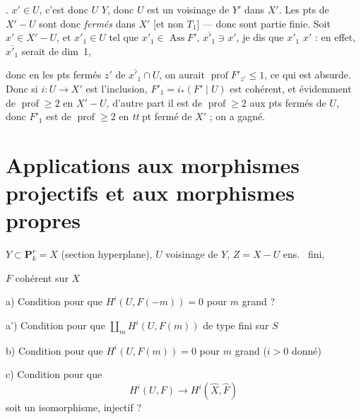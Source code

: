 \documentclass[11pt,a4paper]{article}
\begin{document}
\ill{} \ill{} \ill{}. $x' \in U$, c'est donc \ill{} \ill{} \ill{} $U$ \ill{} \ill{} $Y$, donc $U$ est un voisinage de $Y'$ dans $X'$.  Les pts de $X' - U$ sont donc \emph{fermés} dans $X'$ [et non \ill{} \ill{} \ill{} $T_1$] --- donc sont \ill{} partie \ill{} finie. Soit $x' \in X' - U$, et  $x'_1 \in U$ tel que $x'_1 \in \operatorname{Ass} F'$, $\overline{x'_1} \ni x'$, je dis que \ill{} \ill{} \ill{} \ill{} \ill{} \ill{} $x'_1$ \ill{} $x'$ : \ill{} en effet, $\overline{x'_1}$ serait de dim~1,

donc en les pts fermés $z'$ de $\overline{x'_1} \cap U$, on aurait $\operatorname{prof} F'_{z'} \leq 1$, ce qui est absurde. Donc si $i\colon U \to X'$ est l'inclusion, $F'_1 = i_*(F' \mid U)$ est cohérent, et évidemment de $\operatorname{prof} \geq 2$ en $X' - U$, d'autre part il est de $\operatorname{prof} \geq 2$ aux pts fermés de  $U$, donc $F'_1$ est de $\operatorname{prof} \geq 2$ en \emph{tt} pt fermé de $X'$ ; on a gagné.

\section{Applications aux morphismes projectifs et aux morphismes propres}

$Y \subset \mathbf{P}^r_k = X$ (section hyperplane), $U$ voisinage de $Y$, $Z = X - U$ ens.\  fini,

$F$ cohérent sur $X$

a) Condition pour que $H^i(U, F(-m)) = 0$ pour $m$ grand ?

a') Condition pour que $\coprod_m H^i(U, F(m))$ de type fini sur $S$

b) Condition pour que $H^i(U, F(m)) = 0$ pour $m$ grand ($i > 0$ donné)

c) Condition pour que
\[
  H^i(U, F) \longrightarrow H^i(\hat{X}, \hat{F})
\]
soit un isomorphisme, injectif ?
\end{document}
